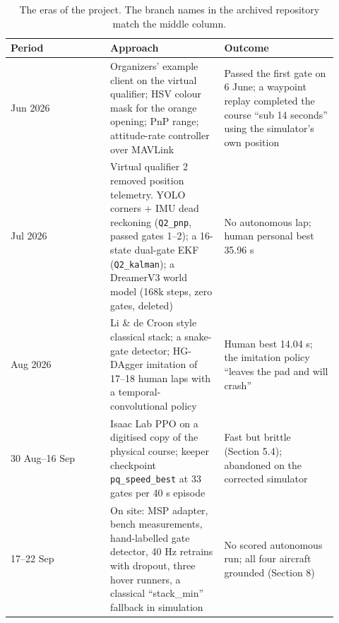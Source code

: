 \documentclass{article}
\begin{document}
\begin{table}[htbp]\centering\small
\begin{tabular}{@{}p{0.28\linewidth}p{0.32\linewidth}p{0.32\linewidth}@{}}
\toprule
Period & Approach & Outcome \\ \midrule
Jun 2026 & Organizers' example client on the virtual qualifier; HSV colour mask for the orange opening; PnP range; attitude-rate controller over MAVLink & Passed the first gate on 6 June; a waypoint replay completed the course ``sub 14 seconds'' using the simulator's own position \\
Jul 2026 & Virtual qualifier 2 removed position telemetry. YOLO corners + IMU dead reckoning (\texttt{Q2\_pnp}, passed gates 1--2); a 16-state dual-gate EKF (\texttt{Q2\_kalman}); a DreamerV3 world model (168k steps, zero gates, deleted) & No autonomous lap; human personal best 35.96 s \\
Aug 2026 & Li \& de Croon style classical stack; a snake-gate detector; HG-DAgger imitation of 17--18 human laps with a temporal-convolutional policy & Human best 14.04 s; the imitation policy ``leaves the pad and will crash'' \\
30 Aug--16 Sep & Isaac Lab PPO on a digitised copy of the physical course; keeper checkpoint \texttt{pq\_speed\_best} at 33 gates per 40 s episode & Fast but brittle (Section 5.4); abandoned on the corrected simulator \\
17--22 Sep & On site: MSP adapter, bench measurements, hand-labelled gate detector, 40 Hz retrains with dropout, three hover runners, a classical ``stack\_min'' fallback in simulation & No scored autonomous run; all four aircraft grounded (Section 8) \\
\bottomrule
\end{tabular}
\caption{The eras of the project. The branch names in the archived repository match the middle column.}\end{table}
\end{document}
